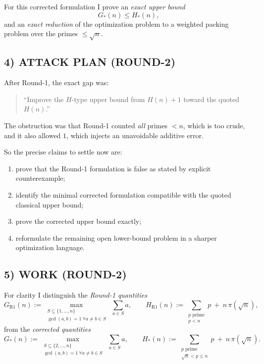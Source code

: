 For this corrected formulation I prove an \emph{exact upper bound}
\[
G_*(n)\le H_*(n),
\]
and an \emph{exact reduction} of the optimization problem to a weighted packing problem over the primes $\le \sqrt n$.

\subsection*{4) ATTACK PLAN (ROUND-2)}
After Round-1, the exact gap was:
\begin{quote}
``Improve the $H$-type upper bound from $H(n)+1$ toward the quoted $H(n)$.''
\end{quote}
The obstruction was that Round-1 counted \emph{all} primes $<n$, which is too crude, and it also allowed $1$, which injects an unavoidable additive error.

So the precise claims to settle now are:
\begin{enumerate}
\item prove that the Round-1 formulation is false as stated by explicit counterexample;
\item identify the minimal corrected formulation compatible with the quoted classical upper bound;
\item prove the corrected upper bound exactly;
\item reformulate the remaining open lower-bound problem in a sharper optimization language.
\end{enumerate}

\subsection*{5) WORK (ROUND-2)}

For clarity I distinguish the \emph{Round-1 quantities}
\[
G_{\mathrm{R1}}(n):=\max_{\substack{S\subseteq\{1,\dots,n\}\\ \gcd(a,b)=1\ \forall a\ne b\in S}}\ \sum_{a\in S}a,
\qquad
H_{\mathrm{R1}}(n):=\sum_{\substack{p\text{ prime}\\ p<n}}p\ +\ n\,\pi(\sqrt n),
\]
from the \emph{corrected quantities}
\[
G_*(n):=\max_{\substack{S\subseteq\{2,\dots,n\}\\ \gcd(a,b)=1\ \forall a\ne b\in S}}\ \sum_{a\in S}a,
\qquad
H_*(n):=\sum_{\substack{p\text{ prime}\\ \sqrt n<p\le n}}p\ +\ n\,\pi(\sqrt n).
\]

